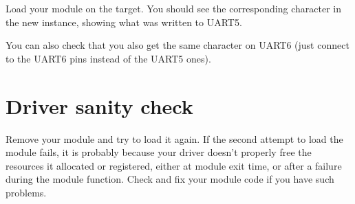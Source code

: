 Load your module on the target. You should see the
corresponding character in the new  instance,
showing what was written to UART5.

You can also check that you also get the same character on UART6
(just connect to the UART6 pins instead of the UART5 ones).

\section{Driver sanity check}

Remove your module and try to load it again. If the second attempt to
load the module fails, it is probably because your driver doesn't
properly free the resources it allocated or registered, either at module
exit time, or after a failure during the module  function. Check
and fix your module code if you have such problems.
